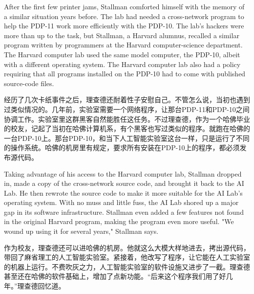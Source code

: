 \ifdefined\eng
After the first few printer jams, Stallman comforted himself with the memory of a similar situation years before. The lab had needed a cross-network program to help the PDP-11 work more efficiently with the PDP-10. The lab's hackers were more than up to the task, but Stallman, a Harvard alumnus, recalled a similar program written by programmers at the Harvard computer-science department. The Harvard computer lab used the same model computer, the PDP-10, albeit with a different operating system. The Harvard computer lab also had a policy requiring that all programs installed on the PDP-10 had to come with published source-code files.
\fi

\ifdefined\chs
经历了几次卡纸事件之后，理查德还耐着性子安慰自己。不管怎么说，当初也遇到过类似情况的。几年前，实验室需要一个网络程序，让那台PDP-11和PDP-10之间协调工作。实验室里这群黑客自然能胜任这任务。不过理查德，作为一个哈佛毕业的校友，记起了当初在哈佛计算机系，有个黑客也写过类似的程序。就跑在哈佛的一台PDP-10上。那台PDP-10，和当下人工智能实验室这台一样，只是运行了不同的操作系统。哈佛的机房里有规定，要求所有安装在PDP-10上的程序，都必须发布源代码。
\fi

\ifdefined\eng
Taking advantage of his access to the Harvard computer lab, Stallman dropped in, made a copy of the cross-network source code, and brought it back to the AI Lab. He then rewrote the source code to make it more suitable for the AI Lab's operating system. With no muss and little fuss, the AI Lab shored up a major gap in its software infrastructure. Stallman even added a few features not found in the original Harvard program, making the program even more useful. "We wound up using it for several years," Stallman says.
\fi

\ifdefined\chs
作为校友，理查德还可以进哈佛的机房。他就这么大模大样地进去，拷出源代码，带回了麻省理工的人工智能实验室。紧接着，他改写了程序，让它能在人工实验室的机器上运行。不费吹灰之力，人工智能实验室的软件设施又进步了一截。理查德甚至还在哈佛的软件基础上，增加了点新功能。``后来这个程序我们用了好几年。''理查德回忆道。
\fi




